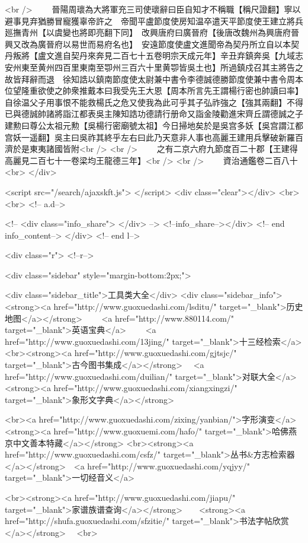 <br />
　　晉陽周瓌為大將軍充三司使瓌辭曰臣自知才不稱職【稱尺證翻】寧以避事見弃猶勝冒寵獲辜帝許之　帝聞平盧節度使房知温卒遣天平節度使王建立將兵廵撫青州【以虞變也將即亮翻下同】　改興唐府曰廣晉府【後唐改魏州為興唐府晉興又改為廣晉府以易世而易府名也】　安遠節度使盧文進聞帝為契丹所立自以本契丹叛將【盧文進自契丹來奔見二百七十五卷明宗天成元年】辛丑弃鎮奔吳【九域志安州東至黄州四百里東南至卾州三百六十里黄卾皆吳土也】所過鎮戍召其主將告之故皆拜辭而退　徐知誥以鎮南節度使太尉兼中書令李德誠德勝節度使兼中書令周本位望隆重欲使之帥衆推戴本曰我受先王大恩【周本所言先王謂楊行密也帥讀曰率】自徐温父子用事恨不能救楊氏之危又使我為此可乎其子弘祚強之【強其兩翻】不得已與德誠帥諸將詣江都表吳主陳知誥功德請行册命又詣金陵勸進宋齊丘謂德誠之子建勲曰尊公太祖元勲【吳楊行密廟號太祖】今日掃地矣於是吳宫多妖【吳宫謂江都宫妖一遥翻】吳主曰吳祚其終乎左右曰此乃天意非人事也高麗王建用兵擊破新羅百濟於是東夷諸國皆附<br />
<br />
　　之有二京六府九節度百二十郡【王建得高麗見二百七十一卷梁均王龍德三年】<br />
<br />
　　資治通鑑卷二百八十  <br>
   </div> 

<script src="/search/ajaxskft.js"> </script>
 <div class="clear"></div>
<br>
<br>
 <!-- a.d-->

 <!--
<div class="info_share">
</div> 
-->
 <!--info_share--></div>   <!-- end info_content-->
  </div> <!-- end l-->

<div class="r">   <!--r-->



<div class="sidebar"  style="margin-bottom:2px;">

 
<div class="sidebar_title">工具类大全</div>
<div class="sidebar_info">
<strong><a href="http://www.guoxuedashi.com/lsditu/" target="_blank">历史地图</a></strong>　　
<a href="http://www.880114.com/" target="_blank">英语宝典</a>　　
<a href="http://www.guoxuedashi.com/13jing/" target="_blank">十三经检索</a>　
<br><strong><a href="http://www.guoxuedashi.com/gjtsjc/" target="_blank">古今图书集成</a></strong>　
<a href="http://www.guoxuedashi.com/duilian/" target="_blank">对联大全</a>　<strong><a href="http://www.guoxuedashi.com/xiangxingzi/" target="_blank">象形文字典</a></strong>　

<br><a href="http://www.guoxuedashi.com/zixing/yanbian/">字形演变</a>　　<strong><a href="http://www.guoxuemi.com/hafo/" target="_blank">哈佛燕京中文善本特藏</a></strong>
<br><strong><a href="http://www.guoxuedashi.com/csfz/" target="_blank">丛书&方志检索器</a></strong>　<a href="http://www.guoxuedashi.com/yqjyy/" target="_blank">一切经音义</a>　　

<br><strong><a href="http://www.guoxuedashi.com/jiapu/" target="_blank">家谱族谱查询</a></strong>　　<strong><a href="http://shufa.guoxuedashi.com/sfzitie/" target="_blank">书法字帖欣赏</a></strong>　
<br>

